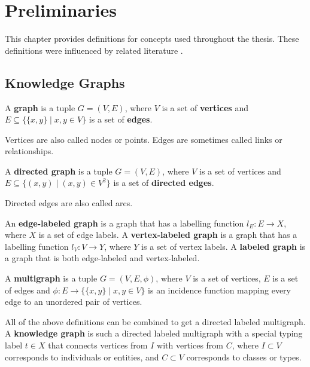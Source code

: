 \chapter{Preliminaries} \label{ch:preliminaries}
This chapter provides definitions for concepts used throughout the thesis. These definitions were influenced by related literature \cite{Hogan2021KG, wikiGraph}.


\section{Knowledge Graphs}

\begin{definition}[Graph]
    A \textbf{graph} is a tuple $G = (V, E)$, where $V$ is a set of \textbf{vertices} and $\displaystyle E\subseteq \{\{x,y\}\mid x,y\in V\}$ is a set of \textbf{edges}.

    Vertices are also called nodes or points. Edges are sometimes called links or relationships.
\end{definition}

\begin{definition}
    A \textbf{directed graph} is a tuple $G = (V,E)$, where $V$ is a set of vertices and $\displaystyle E\subseteq \{(x,y)\mid (x,y)\in V^{2}\}$ is a set of \textbf{directed edges}.

    Directed edges are also called arcs.
\end{definition}

\begin{definition}
    An \textbf{edge-labeled graph} is a graph that has a labelling function $l_E : E \rightarrow X$, where $X$ is a set of edge labels.
    A \textbf{vertex-labeled graph} is a graph that has a labelling function $l_V : V \rightarrow Y$, where $Y$ is a set of vertex labels.
    A \textbf{labeled graph} is a graph that is both edge-labeled and vertex-labeled.
\end{definition}



\begin{definition}[Multigraph]
    A \textbf{multigraph} is a tuple $\displaystyle G=(V,E,\phi )$, where $V$ is a set of vertices, $E$ is a set of edges and $\displaystyle \phi :E\to \{\{x,y\}\mid x,y\in V\}$ is an incidence function mapping every edge to an unordered pair of vertices.
\end{definition}

\begin{definition}
    All of the above definitions can be combined to get a directed labeled multigraph.
    A \textbf{knowledge graph} is such a directed labeled multigraph with a special typing label $t \in X$ that connects vertices from $I$ with vertices from $C$, where $I \subset V$ corresponds to individuals or entities, and $C \subset V$ corresponds to classes or types.
\end{definition}


